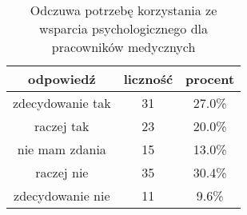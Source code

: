 \begin{table}[H]
\caption{Odczuwa potrzebę korzystania ze wsparcia psychologicznego dla pracowników medycznych}
\centering
\begin{tabular}{ | c | c | c |}
\hline
odpowiedź & liczność & procent\\
\hline
zdecydowanie tak  &  31  & 27.0\% \\
\hline
raczej tak  &  23  & 20.0\% \\
\hline
nie mam zdania  &  15  & 13.0\% \\
\hline
raczej nie  &  35  & 30.4\% \\
\hline
zdecydowanie nie  &  11  & 9.6\% \\
\hline
\end{tabular}
\label{tab:Q22}
\end{table}
